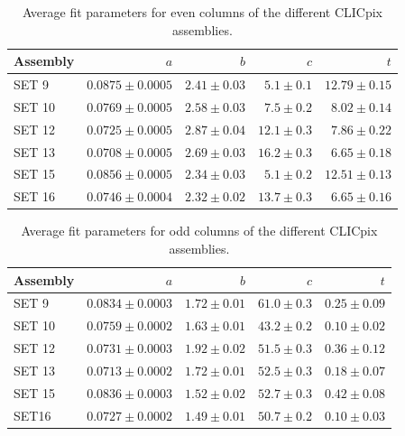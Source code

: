 \begin{table}[h!]
\centering
\begin{tabular}{ l r r r r}
\hline
Assembly & $a$ & $b$ & $c$ & $t$ \\ 
\hline
SET 9   & $0.0875 \pm 0.0005$ & $2.41 \pm 0.03$ & $5.1 \pm 0.1$ & $12.79 \pm 0.15$ \\
SET 10 & $0.0769 \pm 0.0005$ & $2.58 \pm 0.03$ & $7.5 \pm 0.2$ & $8.02 \pm 0.14$ \\
SET 12 & $0.0725 \pm 0.0005$ & $2.87 \pm 0.04$ & $12.1 \pm 0.3$ & $7.86 \pm 0.22$  \\
SET 13 & $0.0708 \pm 0.0005$ & $2.69 \pm 0.03$ & $16.2 \pm 0.3$ & $6.65 \pm 0.18$ \\
SET 15 & $0.0856 \pm 0.0005$ & $2.34 \pm 0.03$ & $5.1 \pm 0.2$ & $12.51 \pm 0.13$ \\
SET 16 & $0.0746 \pm 0.0004$ & $2.32 \pm 0.02$ & $13.7 \pm 0.3$ & $6.65\pm 0.16$ \\
\hline
\end{tabular}
\caption[Average fit parameters for even columns of CLICpix sensor.]{Average fit parameters for even columns of the different CLICpix assemblies.}
\label{table:clicpixfitparamseven}
\end{table}

\begin{table}[h!]
\centering
\begin{tabular}{ l r r r r}
\hline
Assembly & $a$ & $b$ & $c$ & $t$ \\ 
\hline
SET 9   & $0.0834 \pm 0.0003$ & $1.72 \pm 0.01$ & $61.0 \pm 0.3$ & $0.25 \pm 0.09$ \\
SET 10 & $0.0759 \pm 0.0002$ & $1.63 \pm 0.01$ & $43.2 \pm 0.2$ & $0.10 \pm 0.02$ \\
SET 12 & $0.0731 \pm 0.0003$ & $1.92 \pm 0.02$ & $51.5 \pm 0.3$ & $0.36 \pm 0.12$ \\
SET 13 & $0.0713 \pm 0.0002$ & $1.72 \pm 0.01$ & $52.5 \pm 0.3$ & $0.18 \pm 0.07$ \\
SET 15 & $0.0836 \pm 0.0003$ & $1.52 \pm 0.02$ & $52.7 \pm 0.3$ & $0.42 \pm 0.08$ \\
SET16  & $0.0727 \pm 0.0002$ & $1.49 \pm 0.01$ & $50.7 \pm 0.2$ & $0.10 \pm 0.03$ \\
\hline
\end{tabular}
\caption[Average fit parameters for odd columns of CLICpix sensor.]{Average fit parameters for odd columns of the different CLICpix assemblies.}
\label{table:clicpixfitparamsodd}
\end{table}

